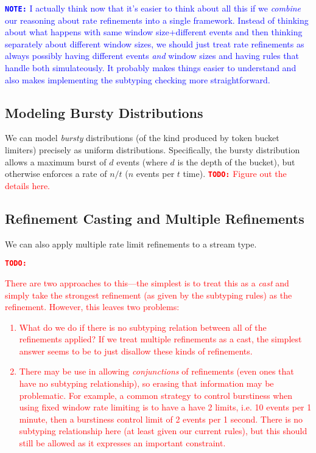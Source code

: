 \documentclass[acmsmall,nonacm,screen]{acmart}
\newcommand{\todo}[1]{\textcolor{red}{\textbf{\texttt{TODO:}} {#1}}}
\newcommand{\note}[1]{\textcolor{blue}{\textbf{\texttt{NOTE:}} {#1}}}
\begin{document}
\note{I actually think now that it's easier to think about all this if we \textit{combine} our reasoning about rate refinements into a single framework. Instead of thinking about what happens with same window size+different events and then thinking separately about different window sizes, we should just treat rate refinements as always possibly having different events \textit{and} window sizes and having rules that handle both simulateously. It probably makes things easier to understand and also makes implementing the subtyping checking more straightforward.}

\subsection{Modeling Bursty Distributions}
We can model \textit{bursty} distributions (of the kind produced by token bucket limiters) precisely as uniform distributions. Specifically, the bursty distribution allows a maximum burst of $d$ events (where $d$ is the depth of the bucket), but otherwise enforces a rate of $n/t$ ($n$ events per $t$ time). \todo{Figure out the details here.}

\subsection{Refinement Casting and Multiple Refinements}
We can also apply multiple rate limit refinements to a stream type. \todo{There are two approaches to this—the simplest is to treat this as a \textit{cast} and simply take the strongest refinement (as given by the subtyping rules) as the refinement. However, this leaves two problems:
  \begin{enumerate}
  \item What do we do if there is no subtyping relation between all of the refinements applied? If we treat multiple refinements as a cast, the simplest answer seems to be to just disallow these kinds of refinements.
  \item There may be use in allowing \textit{conjunctions} of refinements (even ones that have no subtyping relationship), so erasing that information may be problematic. For example, a common strategy to control burstiness when using fixed window rate limiting is to have a have 2 limits, i.e. 10 events per 1 minute, then a burstiness control limit of 2 events per 1 second. There is no subtyping relationship here (at least given our current rules), but this should still be allowed as it expresses an important constraint.
  \end{enumerate}}
\end{document}
